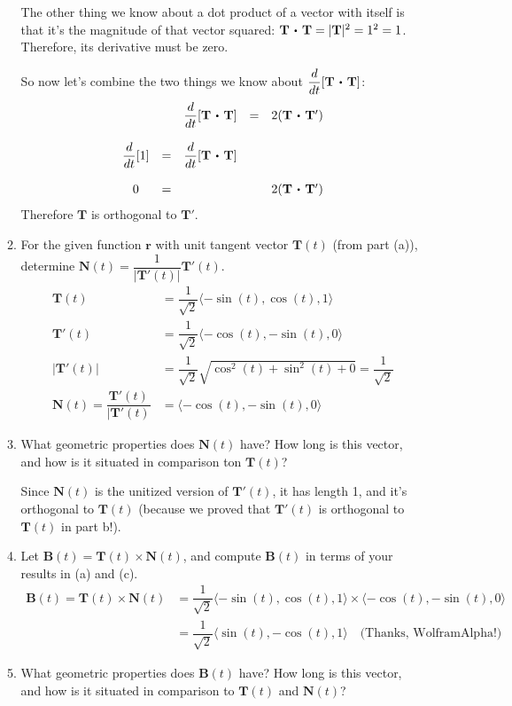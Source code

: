 \documentclass[10pt]{article}
\newcommand{\vr}{\mathbf{r}}
\newcommand{\vT}{\mathbf{T}}
\newcommand{\vN}{\mathbf{N}}
\newcommand{\vB}{\mathbf{B}}
\newcommand\dotp[1][.5]{\,\mathbin{\vcenter{\hbox{\scalebox{#1}{$\bullet$}}}}\,}
\newenvironment{red}{\color{red}}{\ignorespacesafterend}
\begin{document}
\begin{enumerate}[leftmargin=0pt]
\begin{enumerate}
\begin{red}
        The other thing we know about a dot product of a vector with itself is that it's the magnitude of that vector squared: $\vT \dotp \vT = |\vT|^2 = 1^2 = 1$. Therefore, its derivative must be zero.

        So now let's combine the two things we know about $\dfrac{d}{dt}[\vT\dotp\vT]$:
        \[
        \begin{array}{ccccc}
             && \dfrac{d}{dt}[\vT\dotp\vT] &=& 2(\vT\dotp \vT') \\
             &&&&\\
             \dfrac{d}{dt}[1] &=& \dfrac{d}{dt}[\vT\dotp\vT] && \\
             &&&&\\
             0 &=& && 2(\vT\dotp \vT')
        \end{array}
        \]
        Therefore $\vT$ is orthogonal to $\vT'$.
    \end{red}
    \item For the given function $\vr$ with unit tangent vector $\vT(t)$ (from part (a)), determine $\vN(t) = \dfrac{1}{|\vT'(t)|} \vT'(t)$.
    \begin{red}
        \begin{align*}
            \vT(t)&= \dfrac{1}{\sqrt{2}} \langle -\sin(t), \cos(t), 1 \rangle \\
            \vT'(t) &= \dfrac{1}{\sqrt{2}} \langle -\cos(t), -\sin(t), 0 \rangle \\
            |\vT'(t)| &= \dfrac{1}{\sqrt{2}}\sqrt{\cos^2(t) + \sin^2(t)+0} = \dfrac{1}{\sqrt{2}} \\
            \vN(t) = \dfrac{\vT'(t)}{|\vT'(t)}
            &= \langle -\cos(t), -\sin(t), 0 \rangle
        \end{align*}
    \end{red}
    \item What geometric properties does $\vN(t)$ have? How long is this vector, and how is it situated in comparison ton $\vT(t)$?

    \begin{red}
        Since $\vN(t)$ is the unitized version of $\vT'(t)$, it has length 1, and it's orthogonal to $\vT(t)$ (because we proved that $\vT'(t)$ is orthogonal to $\vT(t)$ in part b!).
    \end{red}
    \item Let $\vB(t) = \vT(t) \times \vN(t)$, and compute $\vB(t)$ in terms of your results in (a) and (c).
    \begin{red}
        \begin{align*}
            \vB(t) = \vT(t) \times \vN(t) 
            &= \dfrac{1}{\sqrt{2}} \langle -\sin(t), \cos(t), 1 \rangle \times \langle -\cos(t), -\sin(t), 0 \rangle \\
            &= \dfrac{1}{\sqrt{2}} \langle \sin(t), -\cos(t), 1 \rangle \quad \text{(Thanks, WolframAlpha!)}
        \end{align*}
    \end{red}
    \item What geometric properties does $\vB(t)$ have? How long is this vector, and how is it situated in comparison to $\vT(t)$ and $\vN(t)$?


\end{enumerate}
\end{enumerate}
\end{document}
